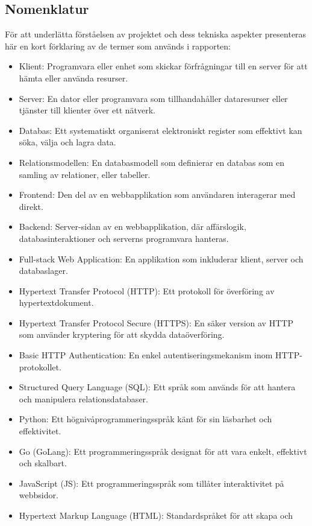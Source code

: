 \subsection{Nomenklatur}
För att underlätta förståelsen av projektet och dess tekniska aspekter
presenteras här en kort förklaring av de termer som används i rapporten:
\begin{itemize}
    \item Klient: Programvara eller enhet som skickar förfrågningar till en
    server för att hämta eller använda resurser.
    \item Server: En dator eller programvara som tillhandahåller dataresurser
    eller tjänster till klienter över ett nätverk.
    \item Databas: Ett systematiskt organiserat elektroniskt register som
    effektivt kan söka, välja och lagra data.
    \item Relationsmodellen: En databasmodell som definierar en databas som en
    samling av relationer, eller tabeller.
    \item Frontend: Den del av en webbapplikation som användaren interagerar
    med direkt.
    \item Backend: Server-sidan av en webbapplikation, där affärslogik,
    databasinteraktioner och serverns programvara hanteras.
    \item Full-stack Web Application: En applikation som inkluderar klient,
    server och databaslager.
    \item Hypertext Transfer Protocol (HTTP): Ett protokoll för överföring av
    hypertextdokument.
    \item Hypertext Transfer Protocol Secure (HTTPS): En säker version av HTTP
    som använder kryptering för att skydda dataöverföring.
    \item Basic HTTP Authentication: En enkel autentiseringsmekanism inom
    HTTP-protokollet.
    \item Structured Query Language (SQL): Ett språk som används för att
    hantera och manipulera relationsdatabaser.
    \item Python: Ett högnivåprogrammeringsspråk känt för sin läsbarhet och
    effektivitet.
    \item Go (GoLang): Ett programmeringsspråk designat för att vara enkelt,
    effektivt och skalbart.
    \item JavaScript (JS): Ett programmeringsspråk som tillåter interaktivitet
    på webbsidor.
    \item Hypertext Markup Language (HTML): Standardspråket för att skapa och

\end{itemize}
